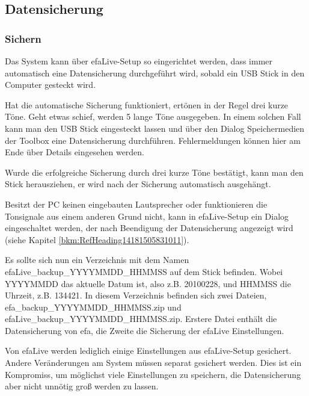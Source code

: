 \documentclass[a4paper,12pt,twoside]{article}
\begin{document}
\subsection[Datensicherung]{Datensicherung}
\subsubsection[Sichern]{Sichern}
\label{bkm:RefHeading16481735636932}Das System kann über efaLive-Setup
so eingerichtet werden, dass immer automatisch eine Datensicherung
durchgeführt wird, sobald ein USB Stick in den Computer gesteckt wird. 

Hat die automatische Sicherung funktioniert, ertönen in der Regel drei
kurze Töne. Geht etwas schief, werden 5 lange Töne ausgegeben. In einem
solchen Fall kann man den USB Stick eingesteckt lassen und über den
Dialog {\textquotedbl}Speichermedien{\textquotedbl} der Toolbox eine
Datensicherung durchführen. Fehlermeldungen können hier am Ende über
{\textquotedbl}Details{\textquotedbl} eingesehen werden.

Wurde die erfolgreiche Sicherung durch drei kurze Töne bestätigt, kann
man den Stick herausziehen, er wird nach der Sicherung automatisch
ausgehängt.

Besitzt der PC keinen eingebauten Lautsprecher oder funktionieren die
Tonsignale aus einem anderen Grund nicht, kann in efaLive-Setup ein
Dialog eingeschaltet werden, der nach Beendigung der Datensicherung
angezeigt wird (siehe Kapitel \ref{bkm:RefHeading14181505831011}).


\bigskip

Es sollte sich nun ein Verzeichnis mit dem Namen
{\textquotedbl}efaLive\_backup\_YYYYMMDD\_HHMMSS{\textquotedbl} auf dem
Stick befinden. Wobei YYYYMMDD das aktuelle Datum ist, also z.B.
20100228, und HHMMSS die Uhrzeit, z.B. 134421. In diesem Verzeichnis
befinden sich zwei Dateien,
{\textquotedbl}efa\_backup\_YYYYMMDD\_HHMMSS.zip{\textquotedbl} und
{\textquotedbl}efaLive\_backup\_YYYYMMDD\_HHMMSS.zip{\textquotedbl}.
Erstere Datei enthält die Datensicherung von efa, die Zweite die
Sicherung der efaLive Einstellungen.


\bigskip

Von efaLive werden lediglich einige Einstellungen aus efaLive-Setup
gesichert. Andere Veränderungen am System müssen separat gesichert
werden. Dies ist ein Kompromiss, um möglichst viele Einstellungen zu
speichern, die Datensicherung aber nicht unnötig groß werden zu lassen.
\end{document}
